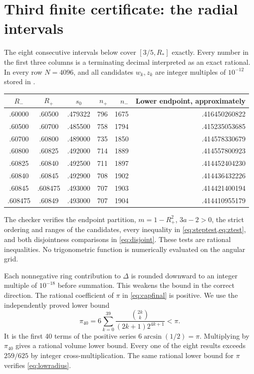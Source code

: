 \documentclass[11pt]{article}
\numberwithin{equation}{section}
\theoremstyle{definition}\newtheorem{definition}[theorem]{Definition}
\theoremstyle{remark}\newtheorem{remark}[theorem]{Remark}
\newcommand{\RS}{R_*}
\begin{document}
\section{Third finite certificate: the radial intervals}\label{sec:radialcert}
The eight consecutive intervals below cover $[3/5,\RS]$ exactly. Every
number in the first three columns is a terminating decimal interpreted as
an exact rational. In every row $N=4096$, and all candidates $w_k,z_k$
are integer multiples of $10^{-12}$ stored in
.
\begin{center}\small
\begin{tabular}{@{}cccrrr@{}}
\toprule
$R_-$ & $R_+$ & $s_0$ & $n_+$ & $n_-$ & Lower endpoint, approximately\\
\midrule
.60000 & .60500 & .479322 & 796 & 1675 & .416450260822\\
.60500 & .60700 & .485500 & 758 & 1794 & .415235053685\\
.60700 & .60800 & .489000 & 735 & 1850 & .414578330679\\
.60800 & .60825 & .492000 & 714 & 1889 & .414557800923\\
.60825 & .60840 & .492500 & 711 & 1897 & .414452404230\\
.60840 & .60845 & .492900 & 708 & 1902 & .414436432226\\
.60845 & .608475 & .493000 & 707 & 1903 & .414421400194\\
.608475 & .60849 & .493000 & 707 & 1904 & .414410955179\\
\bottomrule
\end{tabular}
\end{center}

The checker verifies the endpoint partition, $m=1-R_+^2$, $3a-2>0$, the
strict ordering and ranges of the candidates, every inequality in
\cref{eq:steptest,eq:ztest}, and both disjointness comparisons in
\cref{eq:disjoint}. These tests are rational inequalities. No trigonometric
function is numerically evaluated on the angular grid.

Each nonnegative ring contribution to $\Delta$ is rounded downward to an
integer multiple of $10^{-18}$ before summation. This weakens the bound in
the correct direction. The rational coefficient of $\pi$ in
\cref{eq:capfinal} is positive. We use the independently proved lower bound
\begin{equation}\label{eq:pi40}
 \pi_{40}=6\sum_{k=0}^{39}
       \frac{\binom{2k}{k}}{(2k+1)2^{4k+1}}<\pi.
\end{equation}
It is the first 40 terms of the positive series $6\arcsin(1/2)=\pi$.
Multiplying by $\pi_{40}$ gives a rational volume lower bound. Every one of
the eight results exceeds $259/625$ by integer cross-multiplication.
The same rational lower bound for $\pi$ verifies \cref{eq:lowradius}.
\end{document}
